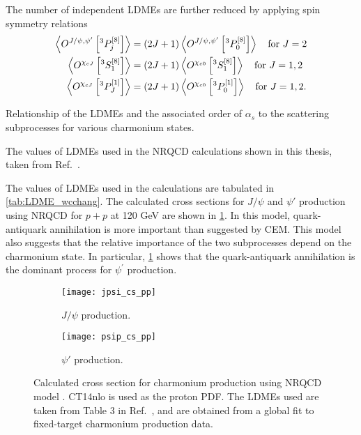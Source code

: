 \documentclass[../main.tex]{subfiles}
\begin{document}
The number of independent LDMEs are further reduced by applying spin symmetry relations
\begin{equation}
	\begin{split}
		\expval{O^{J/\psi,\psi'}\left[^3P_j^{\left[8\right]}\right]} & = \left(2J+1\right)\expval{O^{J/\psi,\psi'}\left[^3P_0^{\left[8\right]}\right]} \quad \text{for }J=2 \\
		\expval{O^{\chi_{cJ}}\left[^3S_1^{\left[8\right]}\right]}    & = \left(2J+1\right)\expval{O^{\chi_{c0}}\left[^3S_1^{\left[8\right]}\right]} \quad \text{for }J=1,2  \\
		\expval{O^{\chi_{cJ}}\left[^3P_J^{\left[1\right]}\right]}    & = \left(2J+1\right)\expval{O^{\chi_{c0}}\left[^3P_0^{\left[1\right]}\right]} \quad \text{for }J=1,2.
	\end{split}
\end{equation}
\begin{table}[h!]
	\centering
	\caption{Relationship of the LDMEs and the associated order of $\alpha_s$ to
		the scattering subprocesses for various charmonium states.}
	\label{tab:LDME_order}
	
\end{table}
\begin{table}[h!]
	\centering
	\caption{The values of LDMEs used in the NRQCD calculations shown in this thesis,
		taken from Ref.~\cite{chang2023}.}
	\label{tab:LDME_wcchang}
	
\end{table}

The values of LDMEs used in the calculations are tabulated in \cref{tab:LDME_wcchang}.
The calculated cross sections for $J/\psi$ and $\psi'$ production using NRQCD for
$p+p$ at 120 GeV are shown in \cref{fig:NRQCD_cs}. In this model, quark-antiquark
annihilation is more important than suggested by CEM. This model also suggests
that the relative importance of the two subprocesses depend on the charmonium state.
In particular, \cref{fig:NRQCD_cs} shows that the quark-antiquark annihilation
is the dominant process for $\psi^\prime$ production.
\begin{figure}[h!]
	\centering
	\begin{subfigure}{0.45\linewidth}
		\texttt{[image: jpsi\_cs\_pp]}
		\caption{$J/\psi$ production.}
	\end{subfigure}
	\quad
	\begin{subfigure}{0.45\linewidth}
		\texttt{[image: psip\_cs\_pp]}
		\caption{$\psi'$ production.}
	\end{subfigure}
	\caption{Calculated cross section for charmonium production using NRQCD model
		\cite{chang2023a}. CT14nlo is used as the proton PDF. The LDMEs used are
		taken from Table \num{3} in Ref.~\cite{chang2023}, and are obtained from a
		global fit to fixed-target charmonium production data. }
	\label{fig:NRQCD_cs}
\end{figure}



\ifSubfilesClassLoaded{ \printbibliography[heading=bibintoc,title={References}]}{}
\end{document}

